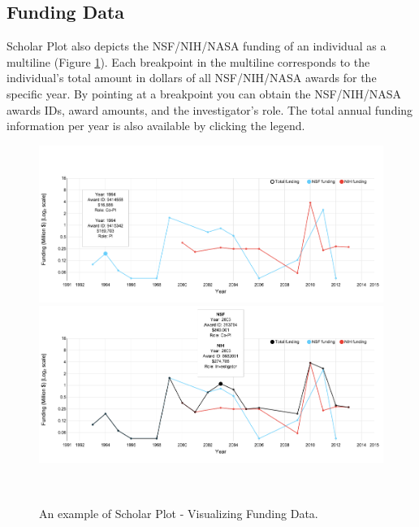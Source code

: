 \subsection{Funding Data}
Scholar Plot also depicts the NSF/NIH/NASA funding of an individual as a multiline (Figure \ref{fig:funding}). Each breakpoint in the multiline corresponds to the individual's total amount in dollars of all NSF/NIH/NASA awards for the specific year. By pointing at a breakpoint you can obtain the NSF/NIH/NASA awards IDs, award amounts, and the investigator's role. The total annual funding information per year is also available by clicking the legend.

\begin{figure}[H]
  \centering
  \includegraphics[width=1\textwidth]{figures/fig_funding_default}
  \includegraphics[width=1\textwidth]{figures/fig_funding_total}
  \caption{An example of Scholar Plot - Visualizing Funding Data.}~\label{fig:funding}
\end{figure}






